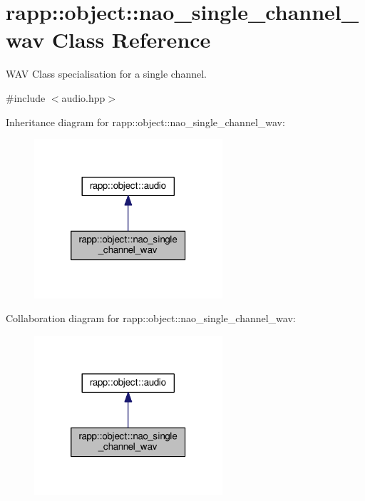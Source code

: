 \hypertarget{classrapp_1_1object_1_1nao__single__channel__wav}{\section{rapp\-:\-:object\-:\-:nao\-\_\-single\-\_\-channel\-\_\-wav Class Reference}
\label{classrapp_1_1object_1_1nao__single__channel__wav}
}


W\-A\-V Class specialisation for a single channel.  




{\ttfamily \#include $<$audio.\-hpp$>$}



Inheritance diagram for rapp\-:\-:object\-:\-:nao\-\_\-single\-\_\-channel\-\_\-wav\-:
\nopagebreak
\begin{figure}[H]
\begin{center}
\leavevmode
\includegraphics[width=198pt]{classrapp_1_1object_1_1nao__single__channel__wav__inherit__graph}
\end{center}
\end{figure}


Collaboration diagram for rapp\-:\-:object\-:\-:nao\-\_\-single\-\_\-channel\-\_\-wav\-:
\nopagebreak
\begin{figure}[H]
\begin{center}
\leavevmode
\includegraphics[width=198pt]{classrapp_1_1object_1_1nao__single__channel__wav__coll__graph}
\end{center}
\end{figure}
